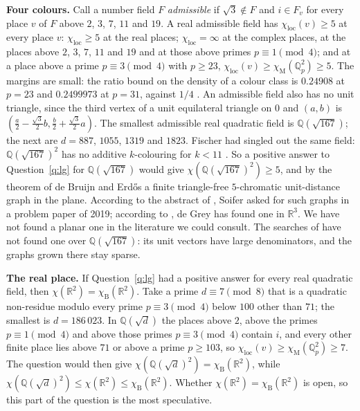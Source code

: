 \documentclass[11pt,a4paper]{amsart}
\theoremstyle{definition}
\newcommand{\Q}{\mathbb{Q}}
\newcommand{\R}{\mathbb{R}}
\newcommand{\chiB}{\chi_{\mathrm{B}}}
\newcommand{\chiM}{\chi_{\mathrm{M}}}
\newcommand{\chiloc}{\chi_{\mathrm{loc}}}
\begin{document}
\textbf{Four colours.} Call a number field $F$ \emph{admissible} if $\sqrt3\notin F$ and $i\in F_v$ for every
place $v$ of $F$ above $2$, $3$, $7$, $11$ and $19$. A real admissible field has $\chiloc(v)\ge5$ at every
place $v$: $\chiloc\ge5$ at the real places; $\chiloc=\infty$ at the complex places, at the
places above $2$, $3$, $7$, $11$ and $19$ and at those above primes $p\equiv1\pmod4$; and at a place above a
prime $p\equiv3\pmod4$ with $p\ge23$, $\chiloc(v)\ge\chiM(\Q_p^2)\ge5$. The margins are small: the ratio bound
on the density of a colour class is $0.24908$ at $p=23$ and $0.2499973$ at $p=31$, against $1/4$
\cite[Table~1]{PP}. An admissible field also has no unit triangle, since the third vertex of a unit equilateral
triangle on $0$ and $(a,b)$ is $(\frac a2-\frac{\sqrt3}2b,\frac b2+\frac{\sqrt3}2a)$. The smallest admissible real
quadratic field is $\Q(\sqrt{167})$; the next are $d=887$, $1055$, $1319$ and $1823$. Fischer had singled out the
same field: $\Q(\sqrt{167})^2$ has no additive $k$-colouring for $k<11$ \cite[Example~4]{Fischer1990}. So a positive answer to
Question~\ref{q:lg} for $\Q(\sqrt{167})$ would give $\chi(\Q(\sqrt{167})^2)\ge5$, and by the theorem of de Bruijn
and Erd\H{o}s \cite{dBE} a finite triangle-free $5$-chromatic unit-distance graph in the plane. According to the
abstract of \cite[Chapter~55]{Soifer2}, Soifer asked for such graphs in a problem paper of 2019; according to
\cite{MW}, de Grey has found one in $\R^3$. We have not found a planar one in the literature we could consult. The searches of \cite{Repo} have not
found one over $\Q(\sqrt{167})$: its unit vectors have large denominators, and the graphs grown there stay sparse.

\textbf{The real place.} If Question~\ref{q:lg} had a positive answer for every real quadratic field, then
$\chi(\R^2)=\chiB(\R^2)$. Take a prime $d\equiv7\pmod8$ that is a quadratic non-residue modulo every prime
$p\equiv3\pmod4$ below $100$ other than $71$; the smallest is $d=186\,023$. In $\Q(\sqrt d)$ the places above
$2$, above the primes $p\equiv1\pmod4$ and above those primes $p\equiv3\pmod4$ contain $i$, and every other finite
place lies above $71$ or above a prime $p\ge103$, so $\chiloc(v)\ge\chiM(\Q_p^2)\ge7$. The question would then give
$\chi(\Q(\sqrt d)^2)=\chiB(\R^2)$, while $\chi(\Q(\sqrt d)^2)\le\chi(\R^2)\le\chiB(\R^2)$. Whether
$\chi(\R^2)=\chiB(\R^2)$ is open, so this part of the question is the most speculative.
\end{document}
